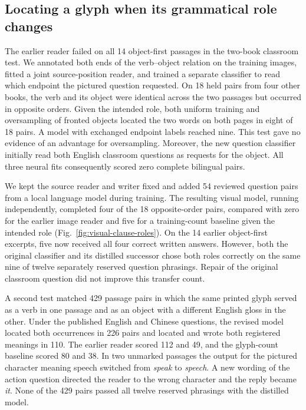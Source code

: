 \subsection*{Locating a glyph when its grammatical role changes}
The earlier reader failed on all 14 object-first passages in the two-book classroom test. We annotated both ends of the verb--object relation on the training images, fitted a joint source-position reader, and trained a separate classifier to read which endpoint the pictured question requested. On 18 held pairs from four other books, the verb and its object were identical across the two passages but occurred in opposite orders. Given the intended role, both uniform training and oversampling of fronted objects located the two words on both pages in eight of 18 pairs. A model with exchanged endpoint labels reached nine. This test gave no evidence of an advantage for oversampling. Moreover, the new question classifier initially read both English classroom questions as requests for the object. All three neural fits consequently scored zero complete bilingual pairs.

We kept the source reader and writer fixed and added 54 reviewed question pairs from a local language model during training. The resulting visual model, running independently, completed four of the 18 opposite-order pairs, compared with zero for the earlier image reader and five for a training-count baseline given the intended role (Fig.~\ref{fig:visual-clause-roles}). On the 14 earlier object-first excerpts, five now received all four correct written answers. However, both the original classifier and its distilled successor chose both roles correctly on the same nine of twelve separately reserved question phrasings. Repair of the original classroom question did not improve this transfer count.

A second test matched 429 passage pairs in which the same printed glyph served as a verb in one passage and as an object with a different English gloss in the other. Under the published English and Chinese questions, the revised model located both occurrences in 226 pairs and located and wrote both registered meanings in 110. The earlier reader scored 112 and 49, and the glyph-count baseline scored 80 and 38. In two unmarked passages the output for the pictured character meaning speech switched from \textit{speak} to \textit{speech}. A new wording of the action question directed the reader to the wrong character and the reply became \textit{it}. None of the 429 pairs passed all twelve reserved phrasings with the distilled model.
